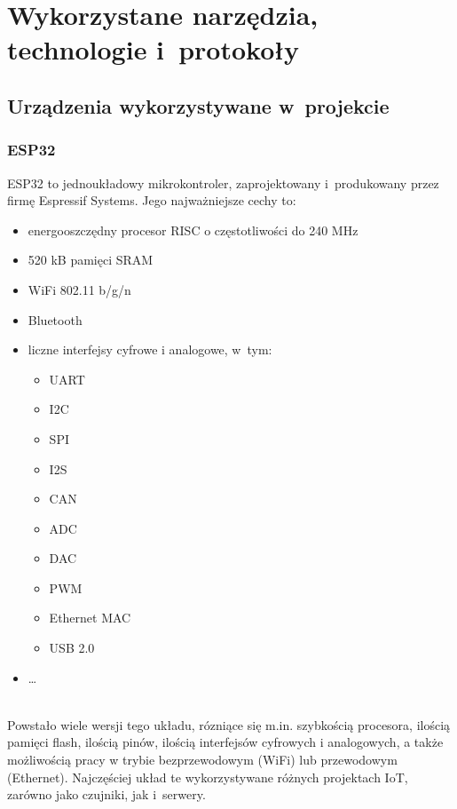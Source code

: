 
\chapter{Wykorzystane narzędzia, technologie i~protokoły}

\section{Urządzenia wykorzystywane w~projekcie}
\subsection{ESP32}
ESP32 to jednoukładowy mikrokontroler, zaprojektowany i~produkowany przez firmę Espressif Systems. Jego najważniejsze cechy to:
\begin{itemize}
    \item energooszczędny procesor RISC o częstotliwości do 240 MHz
    \item 520 kB pamięci SRAM
    \item WiFi 802.11 b/g/n
    \item Bluetooth
    \item liczne interfejsy cyfrowe i analogowe, w~tym:
          \begin{itemize}
              \item UART
              \item I2C
              \item SPI
              \item I2S
              \item CAN
              \item ADC
              \item DAC
              \item PWM
              \item Ethernet MAC
              \item USB 2.0
          \end{itemize}
    \item \dots
\end{itemize} \cite{ESP32:datasheet} \\
Powstało wiele wersji tego układu, rózniące się m.in. szybkością procesora, ilością pamięci flash, ilością pinów, ilością interfejsów cyfrowych i analogowych, a także możliwością pracy w trybie bezprzewodowym (WiFi) lub przewodowym (Ethernet)\cite{ESP32:socs}.
Najczęściej układ te wykorzystywane różnych projektach IoT, zarówno jako czujniki, jak i~serwery.\cite{ESP32:datasheet}


